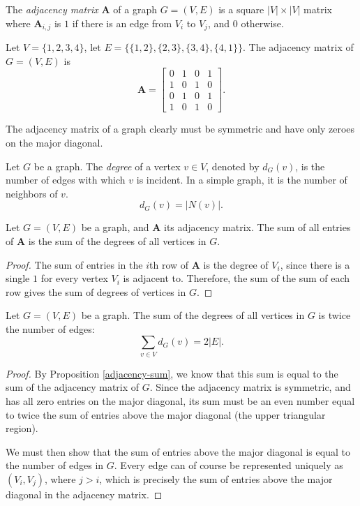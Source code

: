 \begin{defn}
    The \emph{adjacency matrix} $\bm{A}$ of a graph $G = (V, E)$ is a square $|V| \times |V|$ matrix where $\bm{A}_{i, j}$ is $1$ if there is an edge from $V_i$ to $V_j$, and $0$ otherwise.
\end{defn}

\begin{exmp}
    Let $V = \{1, 2, 3, 4\}$, let $E = \{\{1, 2\}, \{2, 3\}, \{3, 4\}, \{4, 1\}\}$. The adjacency matrix of $G = (V, E)$ is
    \[\bm{A} = \begin{bmatrix}
        0 & 1 & 0 & 1 \\
        1 & 0 & 1 & 0 \\
        0 & 1 & 0 & 1 \\
        1 & 0 & 1 & 0
    \end{bmatrix}.\]
\end{exmp}

\begin{rmk}
    The adjacency matrix of a graph clearly must be symmetric and have only zeroes on the major diagonal.
\end{rmk}

\begin{defn}
    Let $G$ be a graph. The \emph{degree} of a vertex $v \in V$, denoted by $d_G(v)$, is the number of edges with which $v$ is incident. In a simple graph, it is the number of neighbors of $v$. \[d_G(v) = |N(v)|.\]
\end{defn}

\begin{prop}\label{adjacency-sum}
    Let $G = (V, E)$ be a graph, and $\bm{A}$ its adjacency matrix. The sum of all entries of $\bm{A}$ is the sum of the degrees of all vertices in $G$.
\end{prop}

\begin{proof}
    The sum of entries in the $i$th row of $\bm{A}$ is the degree of $V_i$, since there is a single $1$ for every vertex $V_i$ is adjacent to. Therefore, the sum of the sum of each row gives the sum of degrees of vertices in $G$.
\end{proof}

\begin{thm}\label{sum-degrees-is-twice-edges}
    Let $G = (V, E)$ be a graph. The sum of the degrees of all vertices in $G$ is twice the number of edges:
    \[\sum_{v\in V}d_G(v) = 2|E|.\]
\end{thm}

\begin{proof}
    By Proposition \ref{adjacency-sum}, we know that this sum is equal to the sum of the adjacency matrix of $G$. Since the adjacency matrix is symmetric, and has all zero entries on the major diagonal, its sum must be an even number equal to twice the sum of entries above the major diagonal (the upper triangular region).

    We must then show that the sum of entries above the major diagonal is equal to the number of edges in $G$. Every edge can of course be represented uniquely as $(V_i, V_j)$, where $j > i$, which is precisely the sum of entries above the major diagonal in the adjacency matrix.
\end{proof}

